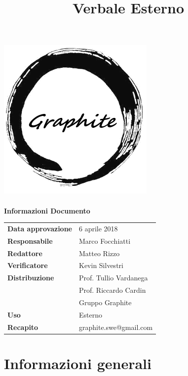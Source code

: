 \documentclass[openany,12pt,a4paper]{article}
\title{Verbale Esterno}
\author{}
\begin{document}
 
  \makeatletter 
  \begin{titlepage} 
    \setlength{\headsep}{0pt}   
    \begin{center} 
      \includegraphics[width=0.5\linewidth]{Logo.png}\\[1em] 
      {\huge \bfseries  \@title }\\[10ex] 
      \textbf{\Large Informazioni Documento} \\[2em] 
      \bgroup 
      \def\arraystretch{1.5} 
      \begin{tabular}{l|l} 
        \textbf{Data approvazione} & 6 aprile 2018 \\ 
        \textbf{Responsabile} & Marco Focchiatti \\ 
        \textbf{Redattore} & Matteo Rizzo \\ 
        \textbf{Verificatore} & Kevin Silvestri \\ 
        \textbf{Distribuzione} & Prof. Tullio Vardanega \\ 
         & Prof. Riccardo Cardin \\ 
         & Gruppo Graphite \\ 
        \textbf{Uso} & Esterno \\ 
        \textbf{Recapito} & graphite.swe@gmail.com \\ 
      \end{tabular} 
    \egroup 
    \end{center} 
  \end{titlepage} 
  \makeatother 
 
  \thispagestyle{empty} 
  \newpage 
   
  \tableofcontents 
  \newpage 
   
  \section{Informazioni generali} 
   
\end{document}
